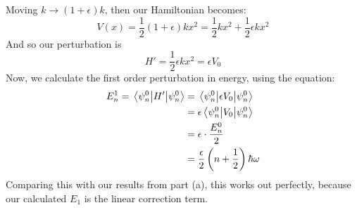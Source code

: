 \documentclass[10pt]{article}
\begin{document}
\begin{enumerate}[label=(\alph*)]
        \begin{solution}
            Moving $k \to (1 + \epsilon)k$, then our Hamiltonian becomes: 
            \[ V(x) = \frac 12 (1 + \epsilon)kx^2 = \frac 12 kx^2 + \frac 12 \epsilon k x^2\]
            And so our perturbation is 
            \[ H' = \frac 12 \epsilon kx^2 = \epsilon V_0\]
            Now, we calculate the first order perturbation in energy, using the equation: 
            \begin{align*}
                E_n^1 = \expval{H'}{\psi_n^0} &= \expval{\epsilon V_0}{\psi_n^0}\\
                &= \epsilon \expval{V_0}{\psi_n^0}\\
                &= \epsilon \cdot \frac{E_n^0}{2}\\
                &= \frac{\epsilon}{2} \left( n + \frac 12 \right) \hbar \omega
            \end{align*}
            Comparing this with our results from part (a), this works out perfectly, because our calculated $E_1$ is the linear correction term.
        \end{solution}
    \end{enumerate}

    \pagebreak
\end{document}
